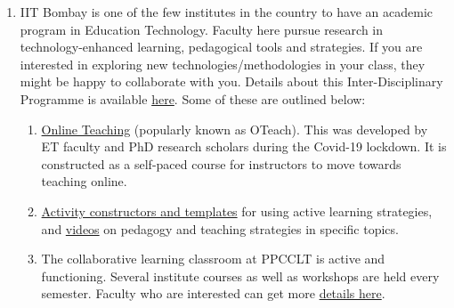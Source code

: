\documentclass[
  10pt,
  a5paper,
  10pt,
  openany]{amsbook}
\begin{document}
\begin{enumerate}
  \begin{enumerate}
  \def\labelenumii{\alph{enumii}.}
  \item
    Centre for Distance Engineering Education Programme (CDEEP) -- which
    helps to prepare video lectures. Details are available on their
    \href{http://www.cdeep.iitb.ac.in/}{website}. Please look in the
    Related Projects section, for information on pedagogy-related
    projects, usually MoE-supported, like TEQIP, GIAN and NMEICT.
  \item
    \href{https://nptel.ac.in/}{National Programme on Technology
    Enhanced Learning (NPTEL)} - a nationwide program supported by MoE
    for high-quality content development in science/technology and
    dissemination through Massive Open Online Courses (MOOCs), with
    facility for testing and certification.
  \end{enumerate}
\item
  IIT Bombay is one of the few institutes in the country to have an
  academic program in Education Technology. Faculty here pursue research
  in technology-enhanced learning, pedagogical tools and strategies. If
  you are interested in exploring new technologies/methodologies in your
  class, they might be happy to collaborate with you. Details about this
  Inter-Disciplinary Programme is available
  \href{http://www.et.iitb.ac.in/}{here}. Some of these are outlined
  below:

  \begin{enumerate}
  \def\labelenumii{\alph{enumii}.}
  \item
    \href{https://sites.google.com/view/iitb-teachonline/}{Online
    Teaching} (popularly known as OTeach). This was developed by ET
    faculty and PhD research scholars during the Covid-19 lockdown. It
    is constructed as a self-paced course for instructors to move
    towards teaching online.
  \item
    \href{https://www.et.iitb.ac.in/products/teaching-resources}{Activity
    constructors and templates} for using active learning strategies,
    and
    \href{https://www.youtube.com/channel/UCfn80M6YJ4Bd5laqxkJVN3Q}{videos}
    on pedagogy and teaching strategies in specific topics.
  \item
    The collaborative learning classroom at PPCCLT is active and
    functioning. Several institute courses as well as workshops are held
    every semester. Faculty who are interested can get more
    \href{http://www.ppcclt.iitb.ac.in/collaborative-learning-and-research-laboratory/}{details
    here}.
  \end{enumerate}
\end{enumerate}
\end{document}

